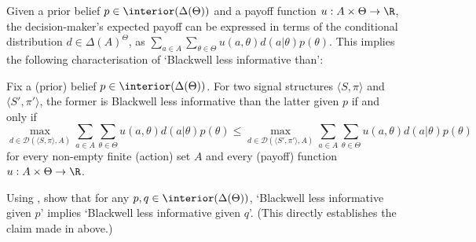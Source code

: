 Given a prior belief $p \in \interior(\Delta(\Theta))$ and a payoff function $u : A \times \Theta \to \R$, the decision-maker's expected payoff can be expressed in terms of the conditional distribution $d \in \Delta(A)^\Theta$, as $\sum_{a \in A} \sum_{\theta \in \Theta} u(a,\theta) d(a|\theta) p(\theta)$. This implies the following characterisation of `Blackwell less informative than':

\begin{observation}
	\label{observation:info_actiondistn}
	Fix a (prior) belief $p \in \interior(\Delta(\Theta))$. For two signal structures $\langle S, \pi \rangle $ and $\langle S', \pi' \rangle $, the former is Blackwell less informative than the latter given $p$ if and only if 
	\begin{equation*}
		\max_{d \in \mathcal{D}(\langle S, \pi \rangle ,A)}
		\sum_{a \in A} \sum_{\theta \in \Theta}
		u(a,\theta) d(a|\theta) p(\theta)
		\leq \max_{d \in \mathcal{D}(\langle S', \pi' \rangle ,A)}
		\sum_{a \in A} \sum_{\theta \in \Theta}
		u(a,\theta) d(a|\theta) p(\theta)
	\end{equation*}
	for every non-empty finite (action) set $A$ and every (payoff) function $u : A \times \Theta \to \R$.
\end{observation}

\begin{exercise}[easy]
	\label{exercise:blackwell_priors}
	Using , show that for any $p,q \in \interior(\Delta(\Theta))$, `Blackwell less informative given $p$' implies `Blackwell less informative given $q$'. (This directly establishes the claim made in  above.)
\end{exercise}

